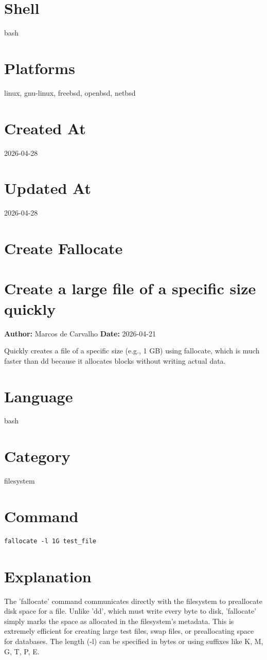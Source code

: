 \documentclass[openany]{book}
\begin{document}
\section*{Shell}
bash

\section*{Platforms}
linux, gnu-linux, freebsd, openbsd, netbsd

\section*{Created At}
2026-04-28

\section*{Updated At}
2026-04-28

\section{Create Fallocate}
\section*{Create a large file of a specific size quickly}
\textbf{Author:} Marcos de Carvalho \hfill \textbf{Date:} 2026-04-21

\noindent Quickly creates a file of a specific size (e.g., 1 GB) using fallocate, which is much faster than dd because it allocates blocks without writing actual data.

\section*{Language}
bash

\section*{Category}
filesystem

\section*{Command}
\begin{lstlisting}
fallocate -l 1G test_file
\end{lstlisting}

\section*{Explanation}
The 'fallocate' command communicates directly with the filesystem to preallocate disk space for a file. Unlike 'dd', which must write every byte to disk, 'fallocate' simply marks the space as allocated in the filesystem's metadata. This is extremely efficient for creating large test files, swap files, or preallocating space for databases. The length (-l) can be specified in bytes or using suffixes like K, M, G, T, P, E.
\end{document}
